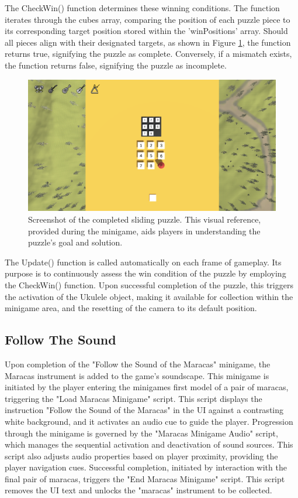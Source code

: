\documentclass{l4proj}
\begin{document}
The CheckWin() function determines these winning conditions. The function iterates through the cubes array, comparing the position of each puzzle piece to its corresponding target position stored within the 'winPositions' array. Should all pieces align with their designated targets, as shown in Figure \ref{fig:puzzle_complete}, the function returns true, signifying the puzzle as complete. Conversely, if a mismatch exists, the function returns false, signifying the puzzle as incomplete.

\begin{figure}[h]
  \centering
  \includegraphics[width=0.7\linewidth]{dissertation/images/Sliding_Complete.png} 
  \caption{Screenshot of the completed sliding puzzle. This visual reference, provided during the minigame, aids players in understanding the puzzle's goal and solution.} 
  \label{fig:puzzle_complete} 
\end{figure}

The Update() function is called automatically on each frame of gameplay. Its purpose is to continuously assess the win condition of the puzzle by employing the CheckWin() function. Upon successful completion of the puzzle, this triggers the activation of the Ukulele object, making it available for collection within the minigame area, and the resetting of the camera to its default position.

\subsection{Follow The Sound}
Upon completion of the "Follow the Sound of the Maracas" minigame, the Maracas instrument is added to the game's soundscape. This minigame is initiated by the player entering the minigames first model of a pair of maracas, triggering the "Load Maracas Minigame" script. This script displays the instruction "Follow the Sound of the Maracas" in the UI against a contrasting white background, and it activates an audio cue to guide the player. Progression through the minigame is governed by the "Maracas Minigame Audio" script, which manages the sequential activation and deactivation of sound sources. This script also adjusts audio properties based on player proximity, providing the player navigation cues. Successful completion, initiated by interaction with the final pair of maracas, triggers the "End Maracas Minigame" script. This script removes the UI text and unlocks the "maracas" instrument to be collected.
\end{document}

